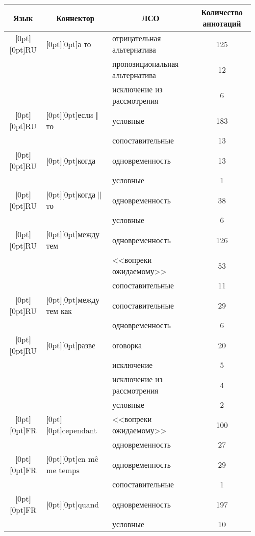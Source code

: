 \begin{multicols}{2}
\begin{table*}[b]
\begin{center}
\begin{tabular}{|c|l|l|c|}
\hline 
\textbf{Язык}&\multicolumn{1}{c|}{\textbf{Коннектор}}&\multicolumn{1}{c|}{\textbf{ЛСО}}&\textbf{Количество аннотаций}\\
\hline
\multicolumn{1}{|c|}{\raisebox{-11pt}[0pt][0pt]{RU}}&\multicolumn{1}{l|}{\raisebox{-11pt}[0pt][0pt]{а то}}&отрицательная альтернатива&125\hphantom{9}\\
&&пропозициональная альтернатива&12\\
&&исключение из рассмотрения&\hphantom{9}6\\
\hline
\multicolumn{1}{|c|}{\raisebox{-6pt}[0pt][0pt]{RU}}&\multicolumn{1}{l|}{\raisebox{-6pt}[0pt][0pt]{если$\|$то}}&условные&183\hphantom{9}\\
&&сопоставительные&13\\
\hline
\multicolumn{1}{|c|}{\raisebox{-6pt}[0pt][0pt]{RU}}&\multicolumn{1}{l|}{\raisebox{-6pt}[0pt][0pt]{когда}}&одновременность&13\\
&&условные&\hphantom{9}1\\
\hline
\multicolumn{1}{|c|}{\raisebox{-6pt}[0pt][0pt]{RU}}&\multicolumn{1}{l|}{\raisebox{-6pt}[0pt][0pt]{когда$\|$то}}&одновременность&38\\
&&условные&\hphantom{9}6\\
\hline
\multicolumn{1}{|c|}{\raisebox{-11pt}[0pt][0pt]{RU}}
&\multicolumn{1}{l|}{\raisebox{-11pt}[0pt][0pt]{между тем}}
&одновременность&126\hphantom{9}\\
&&<<вопреки ожидаемому>>&53\\
&&сопоставительные&11\\
\hline
\multicolumn{1}{|c|}{\raisebox{-6pt}[0pt][0pt]{RU}}&\multicolumn{1}{l|}{\raisebox{-6pt}[0pt][0pt]{между тем как}}&сопоставительные&29\\
&&одновременность&\hphantom{9}6\\
\hline
\multicolumn{1}{|c|}{\raisebox{-18pt}[0pt][0pt]{RU}}
&\multicolumn{1}{l|}{\raisebox{-18pt}[0pt][0pt]{разве}}
&оговорка&20\\
&&исключение&\hphantom{9}5\\
&&исключение из рассмотрения&\hphantom{9}4\\
&&условные&\hphantom{9}2\\
\hline
\multicolumn{1}{|c|}{\raisebox{-6pt}[0pt][0pt]{FR}}&\multicolumn{1}{l|}{\raisebox{-6pt}[0pt][0pt]{cependant}}&<<вопреки ожидаемому>>&100\hphantom{9}\\
&&одновременность&27\\
\hline
\multicolumn{1}{|c|}{\raisebox{-6pt}[0pt][0pt]{FR}}&\multicolumn{1}{l|}{\raisebox{-6pt}[0pt][0pt]{en m$\hat{\mbox{e}}$me temps}}&одновременность&29\\
&&сопоставительные&\hphantom{9}1\\
\hline
\multicolumn{1}{|c|}{\raisebox{-6pt}[0pt][0pt]{FR}}&\multicolumn{1}{l|}{\raisebox{-6pt}[0pt][0pt]{quand}}&одновременность&197\hphantom{9}\\
&&условные&10\\
\hline
\end{tabular}
\end{center}
\end{table*}


\end{multicols}
